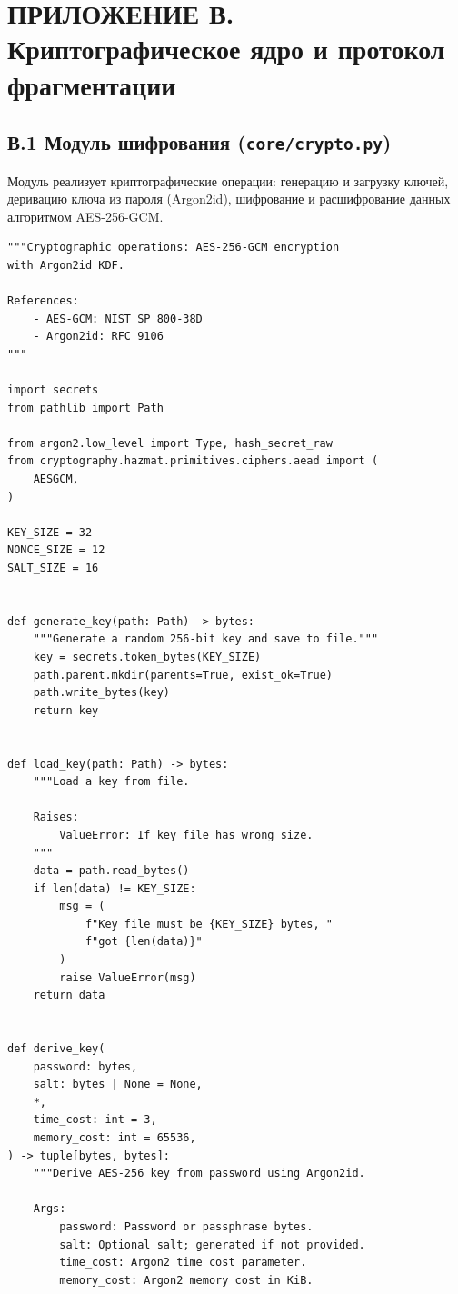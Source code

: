 \newpage
\section*{ПРИЛОЖЕНИЕ В. Криптографическое ядро и протокол фрагментации}

\subsection*{В.1 Модуль шифрования (\texttt{core/crypto.py})}

Модуль реализует криптографические операции: генерацию и загрузку ключей,
деривацию ключа из пароля (Argon2id), шифрование и расшифрование
данных алгоритмом AES-256-GCM.

\begin{lstlisting}[style=appendixcode]
"""Cryptographic operations: AES-256-GCM encryption
with Argon2id KDF.

References:
    - AES-GCM: NIST SP 800-38D
    - Argon2id: RFC 9106
"""

import secrets
from pathlib import Path

from argon2.low_level import Type, hash_secret_raw
from cryptography.hazmat.primitives.ciphers.aead import (
    AESGCM,
)

KEY_SIZE = 32
NONCE_SIZE = 12
SALT_SIZE = 16


def generate_key(path: Path) -> bytes:
    """Generate a random 256-bit key and save to file."""
    key = secrets.token_bytes(KEY_SIZE)
    path.parent.mkdir(parents=True, exist_ok=True)
    path.write_bytes(key)
    return key


def load_key(path: Path) -> bytes:
    """Load a key from file.

    Raises:
        ValueError: If key file has wrong size.
    """
    data = path.read_bytes()
    if len(data) != KEY_SIZE:
        msg = (
            f"Key file must be {KEY_SIZE} bytes, "
            f"got {len(data)}"
        )
        raise ValueError(msg)
    return data


def derive_key(
    password: bytes,
    salt: bytes | None = None,
    *,
    time_cost: int = 3,
    memory_cost: int = 65536,
) -> tuple[bytes, bytes]:
    """Derive AES-256 key from password using Argon2id.

    Args:
        password: Password or passphrase bytes.
        salt: Optional salt; generated if not provided.
        time_cost: Argon2 time cost parameter.
        memory_cost: Argon2 memory cost in KiB.


\end{lstlisting}
